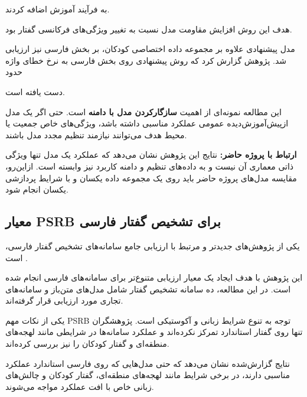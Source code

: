\begin{center}
\end{center}

به فرآیند آموزش اضافه کردند.

هدف این روش افزایش مقاومت مدل نسبت به تغییر ویژگی‌های فرکانسی
گفتار بود.

مدل پیشنهادی علاوه بر مجموعه داده اختصاصی کودکان، بر بخش
فارسی  نیز ارزیابی شد.
پژوهش گزارش کرد که روش پیشنهادی روی بخش فارسی 
به نرخ خطای واژه حدود

\begin{center}
\end{center}

دست یافته است.

این مطالعه نمونه‌ای از اهمیت
\textbf{سازگارکردن مدل با دامنه}
است.
حتی اگر یک مدل ازپیش‌آموزش‌دیده عمومی عملکرد مناسبی داشته باشد،
ویژگی‌های خاص جمعیت یا محیط هدف می‌توانند نیازمند تنظیم مجدد
مدل باشند.

\textbf{ارتباط با پروژه حاضر:}
نتایج این پژوهش نشان می‌دهد که عملکرد یک مدل  تنها ویژگی
ذاتی معماری آن نیست و به داده‌های تنظیم و دامنه کاربرد نیز
وابسته است.
ازاین‌رو، مقایسه مدل‌های پروژه حاضر باید روی یک مجموعه داده
یکسان و با شرایط پردازشی یکسان انجام شود.


\subsection{معیار PSRB برای تشخیص گفتار فارسی}

یکی از پژوهش‌های جدیدتر و مرتبط با ارزیابی جامع سامانه‌های
تشخیص گفتار فارسی،
است \cite{sedghiyeh2025psrb}.

این پژوهش با هدف ایجاد یک معیار ارزیابی متنوع‌تر برای سامانه‌های
 فارسی انجام شده است.
در این مطالعه، ده سامانه تشخیص گفتار شامل مدل‌های متن‌باز و
سامانه‌های تجاری مورد ارزیابی قرار گرفته‌اند.

یکی از نکات مهم PSRB توجه به تنوع شرایط زبانی و آکوستیکی است.
پژوهشگران تنها روی گفتار استاندارد تمرکز نکرده‌اند و عملکرد
سامانه‌ها در شرایطی مانند لهجه‌های منطقه‌ای و گفتار کودکان
را نیز بررسی کرده‌اند.

نتایج گزارش‌شده نشان می‌دهد که حتی مدل‌هایی که روی فارسی
استاندارد عملکرد مناسبی دارند، در برخی شرایط مانند
لهجه‌های منطقه‌ای، گفتار کودکان و چالش‌های زبانی خاص با افت
عملکرد مواجه می‌شوند.

